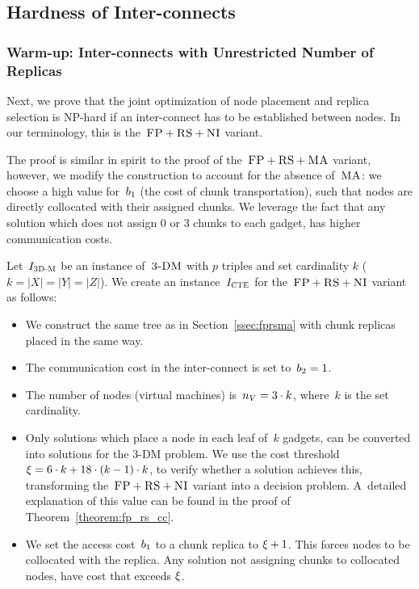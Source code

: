 \subsection{Hardness of Inter-connects}\label{ssec:fprscc}


\subsubsection{Warm-up: Inter-connects with Unrestricted Number of Replicas}

Next, we prove that the joint optimization of node placement and replica selection
is NP-hard if an inter-connect has to be established between nodes.
In our terminology, this is the~$\textsc{FP}+\textsc{RS}+\textsc{NI}$ variant.

The proof is similar in spirit to the proof of the~$\textsc{FP}+\textsc{RS}+\textsc{MA}$ variant, however,
we modify the construction to account for the absence of~$\textsc{MA}$:
we choose
a high value for~$b_1$ (the cost of chunk transportation), such that nodes are directly collocated with
their assigned chunks. We leverage the fact that any solution which does not
assign 0 or 3 chunks to each gadget, has higher communication costs.

Let~$I_{\mathrm{\textsc{3D-M}}}$ be an instance of~$\textsc{3-DM}$ with $p$ triples and set cardinality $k$ ($k = |X| = |Y| = |Z|$). We create an instance~$I_{\mathrm{\textsc{CTE}}}$
for the~$\textsc{FP}+\textsc{RS}+\textsc{NI}$ variant as follows:
\begin{itemize}
\item We construct the same tree as in Section~\ref{ssec:fprsma} with
chunk replicas placed in the same way.
\item The communication cost in the inter-connect is set to~$b_2 = 1$.
\item The number of nodes (virtual machines) is~$n_V = 3 \cdot k$, where~$k$ is the set cardinality.
\item Only solutions which place a node in each leaf of~$k$ gadgets, can
be converted into solutions for the 3-DM problem. We use the cost threshold
$\xi =  6 \cdot k + 18 \cdot
(k - 1) \cdot k$, to verify whether a solution achieves this, transforming
the~$\textsc{FP}+\textsc{RS}+\textsc{NI}$ variant into a decision problem. A~detailed explanation of this value can
be found in the proof of Theorem~\ref{theorem:fp_rs_cc}.
\item We set the access cost~$b_1$ to a chunk replica to $\xi + 1$. This forces
nodes to be collocated with the replica. Any solution not
assigning chunks to collocated nodes, have cost that exceeds $\xi$.
\end{itemize}


